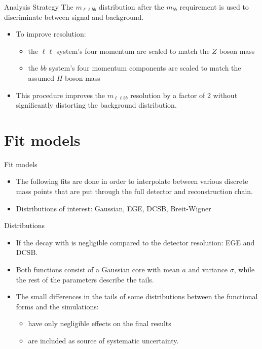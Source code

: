 \documentclass[10pt]{beamer} %
\begin{document}
\begin{frame}{Analysis Strategy}
The $m_{\ell\ell bb}$ distribution after the $m_{bb}$ requirement is used to discriminate between signal and background.
    \begin{itemize}
        \item     To improve resolution:
         \begin{itemize}
             \item the $\ell\ell$ system's four momentum are scaled to match the $Z$ boson mass 
             \item the $bb$ system's four momentum components are scaled to match the assumed $H$ boson mass
         \end{itemize}
        \item     This procedure improves the $m_{\ell\ell bb}$ resolution by a factor of 2 without significantly distorting the background distribution.
    \end{itemize}

\end{frame}

\section{Fit models}

\begin{frame}{Fit models}
    \begin{itemize}
        \item     The following fits are done in order to interpolate between various discrete mass points that are put through the full detector and reconstruction chain.
        \item Distributions of interest: Gaussian, EGE, DCSB, Breit-Wigner

    \end{itemize}



\end{frame}

\begin{frame}{Distributions}
\begin{itemize}
    \item If the decay with is negligible compared to the detector resolution: EGE and DCSB.

    \item Both functions consist of a Gaussian core with mean $a$ and variance $\sigma$, while the rest of the parameters describe the tails.

    \item The small differences in the tails of some distributions between the functional forms and the simulations:
    \begin{itemize}
        \item have only negligible effects on the final results
        \item are included as source of systematic uncertainty.    
    \end{itemize}
    
\end{itemize}
\end{frame}
\end{document}
